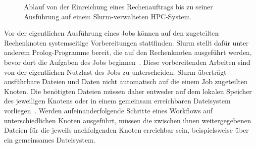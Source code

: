 \begin{figure}[H]
  \centering
  \caption{Ablauf von der Einreichung eines Rechenauftrags bis zu
    seiner Ausführung auf einem Slurm-verwalteten HPC-System.}
  \label{fig:basics:slurm-ablauf}
\end{figure}

Vor der eigentlichen Ausführung eines Jobs können auf den
zugeteilten Rechenknoten systemseitige Vorbereitungen stattfinden.
Slurm stellt dafür unter anderem Prolog-Programme bereit, die auf
den Rechenknoten ausgeführt werden, bevor dort die Aufgaben des
Jobs beginnen~\cite{slurmdocs-prolog}. Diese vorbereitenden
Arbeiten sind von der eigentlichen Nutzlast des Jobs zu
unterscheiden. Slurm überträgt ausführbare Dateien und Daten nicht
automatisch auf die einem Job zugeteilten Knoten. Die benötigten
Dateien müssen daher entweder auf dem lokalen Speicher des
jeweiligen Knotens oder in einem gemeinsam erreichbaren
Dateisystem vorliegen~\cite{slurmdocs-quickstart}. Werden
aufeinanderfolgende Schritte eines Workflows auf unterschiedlichen
Knoten ausgeführt, müssen die zwischen ihnen weitergegebenen
Dateien für die jeweils nachfolgenden Knoten erreichbar sein,
beispielsweise über ein gemeinsames Dateisystem.

